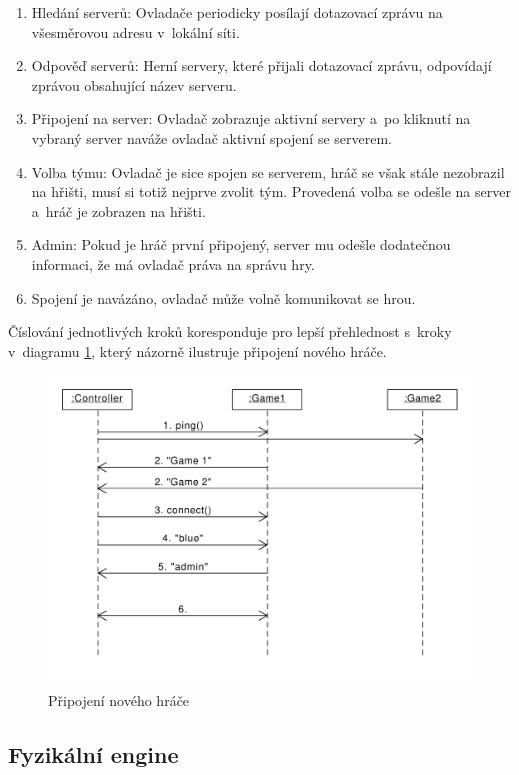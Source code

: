 \documentclass[thesis=B,czech,hidelinks]{FITthesis}[2012/06/26] %
\begin{document}
\begin{enumerate}
	\item Hledání serverů: Ovladače periodicky posílají dotazovací zprávu na všesměrovou adresu v~lokální síti.
	\item Odpověď serverů: Herní servery, které přijali dotazovací zprávu, odpovídají zprávou obsahující název serveru.
	\item Připojení na server: Ovladač zobrazuje aktivní servery a~po kliknutí na vybraný server naváže ovladač aktivní spojení se serverem.
	\item Volba týmu: Ovladač je sice spojen se serverem, hráč se však stále nezobrazil na hřišti, musí si totiž nejprve zvolit tým. Provedená volba se odešle na server a~hráč je zobrazen na hřišti.
	\item Admin: Pokud je hráč první připojený, server mu odešle dodatečnou informaci, že má ovladač práva na správu hry.
	\item Spojení je navázáno, ovladač může volně komunikovat se hrou.
\end{enumerate}

Číslování jednotlivých kroků koresponduje pro lepší přehlednost s~kroky v~diagramu \ref{picture:connection}, který názorně ilustruje připojení nového hráče. 

\begin{figure}[h]
\includegraphics[width=\textwidth]{connection}
\caption{Připojení nového hráče}
\label{picture:connection}
\end{figure}

\subsection{Fyzikální engine}
\end{document}
